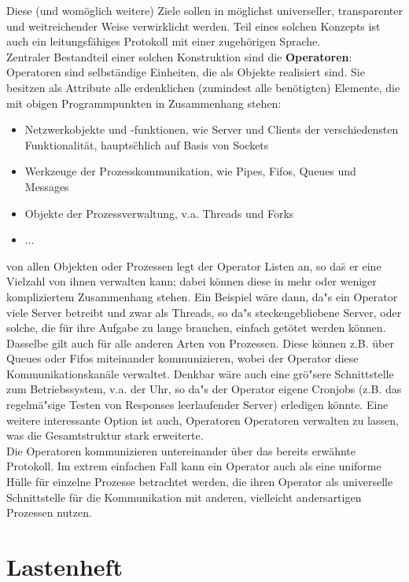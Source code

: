 Diese (und wom\"oglich weitere) Ziele sollen in m\"oglichst
universeller, transparenter und weitreichender Weise verwirklicht
werden. Teil eines solchen Konzepts ist auch ein leitungsf\"ahiges
Protokoll mit einer zugeh\"origen Sprache.
\\
Zentraler Bestandteil einer solchen Konstruktion sind die
\textbf{Operatoren}: Operatoren sind selbst\"andige Einheiten, die als
Objekte realisiert sind. Sie besitzen als Attribute alle erdenklichen
(zumindest alle ben\"otigten) Elemente, die mit obigen Programmpunkten
in Zusammenhang stehen:
\begin{itemize}
\item Netzwerkobjekte und -funktionen, wie Server und Clients der
  verschiedensten Funktionalit\"at, haupts\"chlich auf Basis von
  Sockets
\item Werkzeuge der Prozesskommunikation, wie Pipes, Fifos, Queues und
  Messages
\item Objekte der Prozessverwaltung, v.a. Threads und Forks
\item ...
\end{itemize}
von allen Objekten oder Prozessen legt der Operator Listen an, so
da\"s er eine Vielzahl von ihnen verwalten kann; dabei k\"onnen diese
in mehr oder weniger kompliziertem Zusammenhang stehen.  Ein Beispiel
w\"are dann, da"s ein Operator viele Server betreibt und zwar als
Threads, so da"s steckengebliebene Server, oder solche, die f\"ur ihre
Aufgabe zu lange brauchen, einfach get\"otet werden k\"onnen.
Dasselbe gilt auch f\"ur alle anderen Arten von Prozessen. Diese
k\"onnen z.B. \"uber Queues oder Fifos miteinander kommunizieren,
wobei der Operator diese Kommunikationskan\"ale verwaltet.  Denkbar
w\"are auch eine gr\"o"sere Schnittstelle zum Betriebssystem, v.a.
der Uhr, so da"s der Operator eigene Cronjobs (z.B. das regelm\"a"sige
Testen von Responses leerlaufender Server) erledigen k\"onnte.  Eine
weitere interessante Option ist auch, Operatoren Operatoren verwalten
zu
lassen, was die Gesamtstruktur stark erweiterte. \\
Die Operatoren kommunizieren untereinander \"uber das bereits
erw\"ahnte Protokoll. Im extrem einfachen Fall kann ein Operator auch
als eine uniforme H\"ulle f\"ur einzelne Prozesse betrachtet werden,
die ihren Operator als universelle Schnittstelle f\"ur die
Kommunikation mit anderen, vielleicht andersartigen Prozessen nutzen.

\section{Lastenheft}

